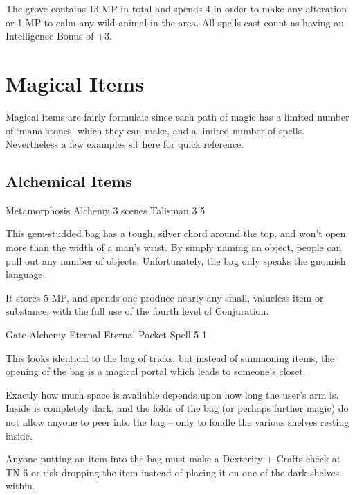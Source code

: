 \begin{multicols}{2}

The grove contains 13 MP in total and spends 4 in order to make any alteration or 1 MP to calm any wild animal in the area.
All spells cast count as having an Intelligence Bonus of +3.

\end{multicols}

\section{Magical Items}
\label{magicalitems}

\begin{multicols}{2}

\noindent
Magical items are fairly formulaic since each path of magic has a limited number of `mana stones' which they can make, and a limited number of spells.
Nevertheless a few examples sit here for quick reference.

\subsection{Alchemical Items}

  {Metamorphosis}%
  {Alchemy}%
  {3 scenes}%
  {Talisman}%
  {3}%
  {5}%

This gem-studded bag has a tough, silver chord around the top, and won't open more than the width of a man's wrist.
By simply naming an object, people can pull out any number of objects.
Unfortunately, the bag only speaks the gnomish language.

It stores 5 MP, and spends one produce nearly any small, valueless item or substance, with the full use of the fourth level of Conjuration.

\label{bagOfHolding}
  {Gate}%
  {Alchemy}%
  {Eternal}%
  {Eternal Pocket Spell}%
  {5}%
  {1}%

This looks identical to the bag of tricks, but instead of summoning items, the opening of the bag is a magical portal which leads to someone's closet.

Exactly how much space is available depends upon how long the user's arm is.  Inside is completely dark, and the folds of the bag (or perhaps further magic) do not allow anyone to peer into the bag -- only to fondle the various shelves resting inside.

Anyone putting an item into the bag must make a Dexterity + Crafts check at TN 6 or risk dropping the item instead of placing it on one of the dark shelves within.


\end{multicols}
